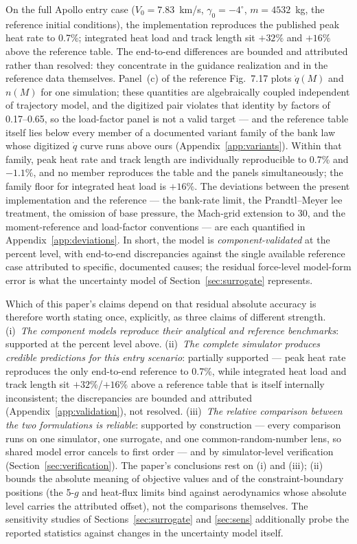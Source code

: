 On the full Apollo entry case ($V_0=7.83$~km/s, $\gamma_0=-4^\circ$,
$m=4532$~kg, the reference initial conditions), the implementation
reproduces the published peak heat rate to 0.7\%; integrated heat load and
track length sit $+32\%$ and $+16\%$ above the reference table. The
end-to-end differences are bounded and attributed rather than resolved:
they concentrate in the guidance realization and in the reference data
themselves. Panel~(c) of the reference Fig.~7.17 plots $\dot{q}(M)$ and
$n(M)$ for one simulation; these quantities are algebraically coupled
independent of trajectory model, and the digitized pair violates that
identity by factors of 0.17--0.65, so the load-factor panel is not a valid
target --- and the reference table itself lies below every member of a
documented variant family of the bank law whose digitized $\dot{q}$ curve
runs above ours (Appendix~\ref{app:variants}). Within that family, peak
heat rate and track length are individually reproducible to 0.7\% and
$-1.1\%$, and no member reproduces the table and the panels
simultaneously; the family floor for integrated heat load is $+16\%$. The
deviations between the present implementation and the reference --- the
bank-rate limit, the Prandtl--Meyer lee treatment, the omission of base
pressure, the Mach-grid extension to 30, and the moment-reference and
load-factor conventions --- are each quantified in
Appendix~\ref{app:deviations}. In short, the model is
\emph{component-validated} at the percent level, with end-to-end
discrepancies against the single available reference case attributed to
specific, documented causes; the residual force-level model-form error is
what the uncertainty model of Section~\ref{sec:surrogate} represents.

Which of this paper's claims depend on that residual absolute accuracy is
therefore worth stating once, explicitly, as three claims of different
strength. (i)~\emph{The component models reproduce their analytical and
reference benchmarks}: supported at the percent level above. (ii)~\emph{The
complete simulator produces credible predictions for this entry
scenario}: partially supported --- peak heat rate reproduces the only
end-to-end reference to 0.7\%, while integrated heat load and track length
sit $+32\%$/$+16\%$ above a reference table that is itself internally
inconsistent; the discrepancies are bounded and attributed
(Appendix~\ref{app:validation}), not resolved. (iii)~\emph{The relative
comparison between the two formulations is reliable}: supported by
construction --- every comparison runs on one simulator, one surrogate,
and one common-random-number lens, so shared model error cancels to first
order --- and by simulator-level verification
(Section~\ref{sec:verification}). The paper's conclusions rest on (i)
and (iii); (ii) bounds the absolute meaning of objective values and of
the constraint-boundary positions (the 5-$g$ and heat-flux limits bind
against aerodynamics whose absolute level carries the attributed offset),
not the comparisons themselves. The sensitivity studies of
Sections~\ref{sec:surrogate} and \ref{sec:sens} additionally probe the
reported statistics against changes in the uncertainty model itself.

